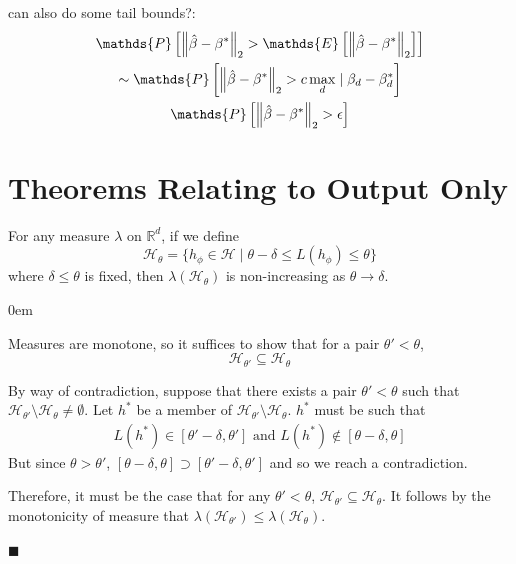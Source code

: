 \documentclass[12pt]{article}
\renewcommand{\qed}{\hfill$\blacksquare$}
\renewenvironment{proof}{\begin{addmargin}[1em]{0em}\begin{newproof}}{\end{newproof}\end{addmargin}\qed}
\newenvironment{lemma}[2][Lemma]{\begin{trivlist}
\item[\hskip \labelsep {\bfseries #1}\hskip \labelsep {\bfseries #2.}]}{\end{trivlist}}
\begin{document}
can also do some tail bounds?:
\begin{gather*}
    \mathds{P}\left[\norm{\hat{\beta}-\beta^*}_2 >  \mathds{E}\left[\norm{\hat{\beta}-\beta^*}_2\right]\right] \\
    \sim \mathds{P}\left[\norm{\hat{\beta}-\beta^*}_2 >  c \max_d \mid \beta_d - \beta^*_d\right] \\
    \mathds{P}\left[\norm{\hat{\beta}-\beta^*}_2 >  \epsilon\right] \\
\end{gather*}
\pagebreak

\section{Theorems Relating to Output Only}


  \begin{lemma}{1}
    For any measure $\lambda$ on $\mathbb{R}^d$, if we define
    \begin{equation*}
        \mathcal{H}_\theta = \{h_\phi \in \mathcal{H} \mid \theta - \delta \leq L(h_\phi)\leq \theta\}
    \end{equation*}
    where $\delta \leq \theta$ is fixed, then $\lambda(\mathcal{H}_\theta)$ is non-increasing as $\theta\rightarrow \delta$.
 \end{lemma}

\begin{proof}
    Measures are monotone, so it suffices to show that for a pair $\theta' < \theta$, 
    \begin{equation*}
        \mathcal{H}_{\theta'} \subseteq \mathcal{H}_\theta
    \end{equation*}

    By way of contradiction, suppose that there exists a pair $\theta' < \theta$ such that  $\mathcal{H}_{\theta'} \setminus \mathcal{H}_\theta \neq \emptyset$. Let $h^*$ be a member of $\mathcal{H}_{\theta'} \setminus \mathcal{H}_\theta$. $h^*$ must be such that
    \begin{gather*}
        L(h^*) \in [\theta'-\delta,\theta'] \text{ and } L(h^*) \notin [\theta-\delta,\theta]
    \end{gather*}
    But since $\theta > \theta'$, $[\theta-\delta,\theta]\supset [\theta'-\delta,\theta']$ and so we reach a contradiction.

    Therefore, it must be the case that for any $\theta' < \theta$, $\mathcal{H}_{\theta'} \subseteq \mathcal{H}_\theta$. It follows by the monotonicity of measure that $\lambda(\mathcal{H}_{\theta'})\leq \lambda(\mathcal{H}_\theta)$. 
\end{proof}
\end{document}
